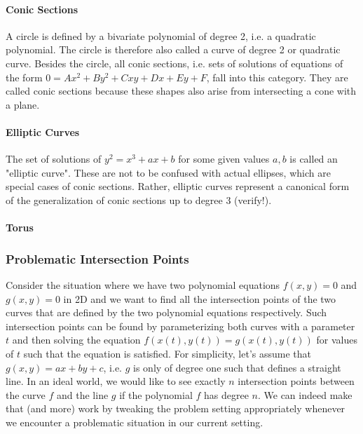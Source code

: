 \paragraph{Conic Sections}
A circle is defined by a bivariate polynomial of degree 2, i.e. a quadratic polynomial. The circle is therefore also called a curve of degree 2 or quadratic curve. Besides the circle, all conic sections, i.e. sets of solutions of equations of the form $0 = A x^2 + B y^2 + C x y + D x + E y + F$, fall into this category. They are called conic sections because these shapes also arise from intersecting a cone with a plane.

\paragraph{Elliptic Curves}
The set of solutions of $y^2 = x^3 + a x + b$ for some given values $a,b$ is called an "elliptic curve". These are not to be confused with actual ellipses, which are special cases of conic sections. Rather, elliptic curves represent a canonical form of the generalization of conic sections up to degree 3 (verify!).



\paragraph{Torus}








\subsubsection{Problematic Intersection Points}
Consider the situation where we have two polynomial equations $f(x,y) = 0$ and $g(x,y) = 0$ in 2D and we want to find all the intersection points of the two curves that are defined by the two polynomial equations respectively. Such intersection points can be found by parameterizing both curves with a parameter $t$ and then solving the equation $f(x(t),y(t)) = g(x(t),y(t))$ for values of $t$ such that the equation is satisfied. For simplicity, let's assume that $g(x,y) = ax + by + c$, i.e. $g$ is only of degree one such that defines a straight line. In an ideal world, we would like to see exactly $n$ intersection points between the curve $f$ and the line $g$ if the polynomial $f$ has degree $n$. We can indeed make that (and more) work by tweaking the problem setting appropriately whenever we encounter a problematic situation in our current setting.

